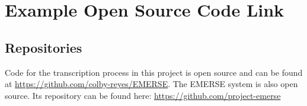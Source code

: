 
\chapter{Example Open Source Code Link}



\section{Repositories}
\label{sec:code_appendix}
Code for the transcription process in this project is open source and can be found at \url{https://github.com/colby-reyes/EMERSE}.
The EMERSE system is also open source. Its repository can be found here: \url{https://github.com/project-emerse}



